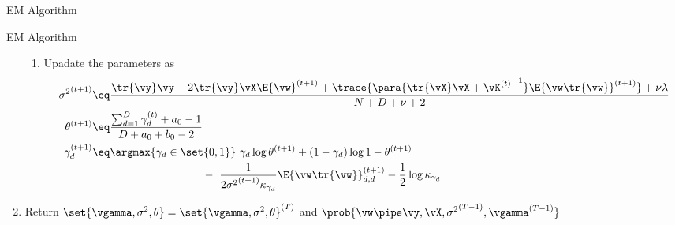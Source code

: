 \documentclass{article}
\begin{document}
\begin{question}
\begin{qsection}{EM Algorithm}
\begin{algo}[0.9\textwidth]{EM Algorithm}
\begin{enumerate}
\begin{enumerate}
						\item Upadate the parameters as
							\begin{align*}
								{\sigma^2}^{(t + 1)}	&\eq	\frac{\tr{\vy} \vy - 2 \tr{\vy} \vX \E{\vw}^{(t + 1)} + \trace{\para{\tr{\vX} \vX + {\vK^{(t)}}^{-1}} \E{\vw \tr{\vw}}^{(t + 1)}} + \nu \lambda}{N + D + \nu + 2} \\
								\theta^{(t + 1)}		&\eq	\frac{\sum_{d = 1}^D \gamma_d^{(t)} + a_0 - 1}{D + a_0 + b_0 - 2} \\
								\gamma_d^{(t + 1)}		&\eq	\argmax{\gamma_d \in \set{0, 1}}\ \gamma_d \log{\theta^{(t + 1)}} + (1 - \gamma_d) \log{1 - \theta^{(t + 1)}} \\
								&\hspace{3.5cm} - \  \frac{1}{2 {\sigma^2}^{(t + 1)} \kappa_{\gamma_d}} \E{\vw \tr{\vw}}_{d, d}^{(t + 1)} - \frac{1}{2} \log{\kappa_{\gamma_d}}
							\end{align*}
					\end{enumerate}
				\item Return $\set{\vgamma, \sigma^2, \theta} = \set{\vgamma, \sigma^2, \theta}^{(T)}$ and $\prob{\vw \pipe \vy, \vX, {\sigma^2}^{(T - 1)}, \vgamma^{(T - 1)}}$
			\end{enumerate}

		\end{algo}

	\end{qsection}


\end{question}
\end{document}
